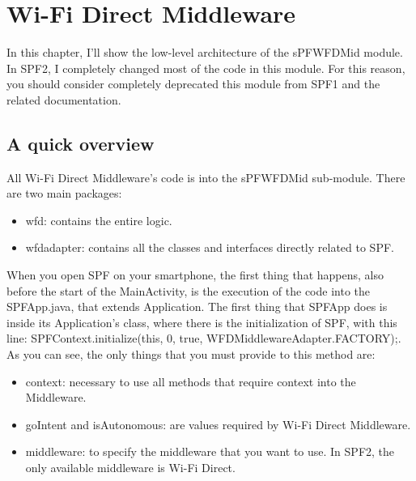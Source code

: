 \chapter{Wi-Fi Direct Middleware}
\label{chap2}
\thispagestyle{empty}

\noindent In this chapter, I'll show the low-level architecture of the \textsf{sPFWFDMid} module. In SPF2, I completely changed most of the code in this module. For this reason, you should consider completely deprecated this module from SPF1 and the related documentation.

\section{A quick overview}

All Wi-Fi Direct Middleware's code is into the \textsf{sPFWFDMid} sub-module. There are two main packages:

\begin{itemize}
	\item \textsf{wfd}: contains the entire logic.
	\item \textsf{wfdadapter}: contains all the classes and interfaces directly related to SPF.
\end{itemize}

When you open SPF on your smartphone, the first thing that happens, also before the start of the MainActivity, is the execution of the code into the \textsf{SPFApp.java}, that extends \textsf{Application}. 
The first thing that \textsf{SPFApp} does is inside its Application's class, where there is the initialization of SPF, with this line: \textsf{SPFContext.initialize(this, 0, true, WFDMiddlewareAdapter.FACTORY);}. As you can see, the only things that you must provide to this method are:
\begin{itemize}
	\item \textsf{context}: necessary to use all methods that require context into the Middleware.
	\item \textsf{goIntent} and \textsf{isAutonomous}: are values required by Wi-Fi Direct Middleware.
	\item \textsf{middleware}: to specify the middleware that you want to use. In SPF2, the only available middleware is Wi-Fi Direct.
\end{itemize}


